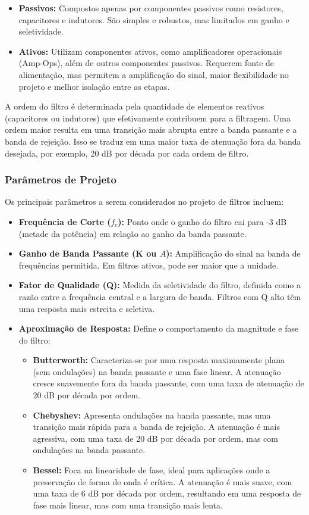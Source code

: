         \begin{itemize}
            \item \textbf{Passivos:} Compostos apenas por componentes passivos como resistores, capacitores e indutores. São simples e robustos, mas limitados em ganho e seletividade.
            \item \textbf{Ativos:} Utilizam componentes ativos, como amplificadores operacionais (Amp-Ops), além de outros componentes passivos. Requerem fonte de alimentação, mas permitem a amplificação do sinal, maior flexibilidade no projeto e melhor isolação entre as etapas.
        \end{itemize}
A ordem do filtro é determinada pela quantidade de elementos reativos (capacitores ou indutores) que efetivamente contribuem para a filtragem. Uma ordem maior resulta em uma transição mais abrupta entre a banda passante e a banda de rejeição. Isso se traduz em uma maior taxa de atenuação fora da banda desejada, por exemplo, 20 dB por década por cada ordem de filtro.

\subsubsection{Parâmetros de Projeto}
Os principais parâmetros a serem considerados no projeto de filtros incluem:
\begin{itemize}
    \item \textbf{Frequência de Corte ($f_c$):} Ponto onde o ganho do filtro cai para -3 dB (metade da potência) em relação ao ganho da banda passante.
    \item \textbf{Ganho de Banda Passante (K ou $A$):} Amplificação do sinal na banda de frequências permitida. Em filtros ativos, pode ser maior que a unidade.
    \item \textbf{Fator de Qualidade (Q):} Medida da seletividade do filtro, definida como a razão entre a frequência central e a largura de banda. Filtros com Q alto têm uma resposta mais estreita e seletiva.
    \item \textbf{Aproximação de Resposta:} Define o comportamento da magnitude e fase do filtro:
    \begin{itemize}
        \item \textbf{Butterworth:} Caracteriza-se por uma resposta maximamente plana (sem ondulações) na banda passante e uma fase linear. A atenuação cresce suavemente fora da banda passante, com uma taxa de atenuação de 20 dB por década por ordem.
        \item \textbf{Chebyshev:} Apresenta ondulações na banda passante, mas uma transição mais rápida para a banda de rejeição. A atenuação é mais agressiva, com uma taxa de 20 dB por década por ordem, mas com ondulações na banda passante.
        \item \textbf{Bessel:} Foca na linearidade de fase, ideal para aplicações onde a preservação de forma de onda é crítica. A atenuação é mais suave, com uma taxa de 6 dB por década por ordem, resultando em uma resposta de fase mais linear, mas com uma transição mais lenta.
    \end{itemize}
\end{itemize}

